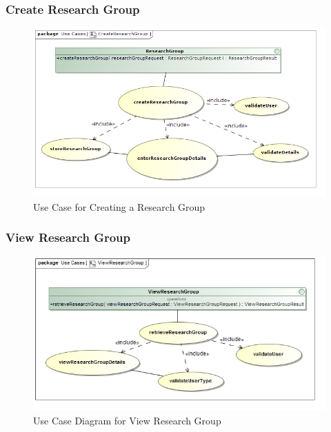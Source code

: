\documentclass[a4paper,10pt]{article}
\begin{document}
\subsubsection{Create Research Group}
	\begin{figure}[H]
		\includegraphics[scale=0.5]{CreateResearchGroupUse}
	\caption{Use Case for Creating a Research Group}
	\end{figure}
	
\subsubsection{View Research Group}
	\begin{figure}[H]
		\includegraphics[scale=0.5]{UseViewResearchGroup}
		\caption{Use Case Diagram for View Research Group}
	\end{figure}
	
\end{document}

